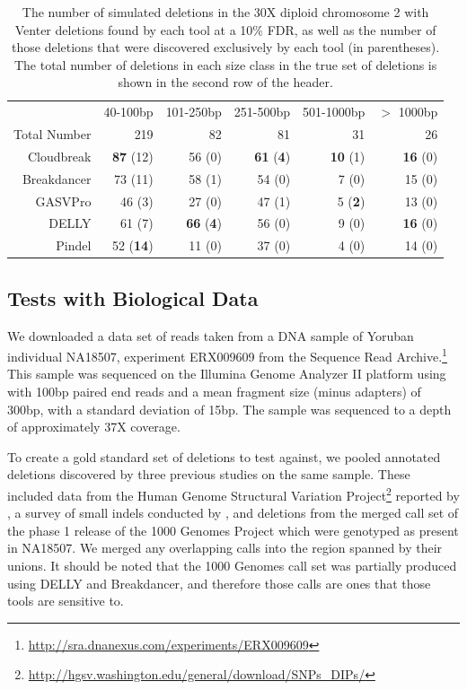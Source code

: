 \documentclass[11pt]{article}
\begin{document}
\begin{table}[b]
\begin{center}
\begin{tabular}{rrrrrr}
  \hline
 & 40-100bp  & 101-250bp  & 251-500bp & 501-1000bp & $>$ 1000bp \\ 
 Total Number & 219 & 82 & 81 & 31 & 26 \\ 
  \hline
Cloudbreak &  \textbf{87} (12) &  56 (0) &  \textbf{61} (\textbf{4}) &  \textbf{10} (1) &  \textbf{16} (0) \\ 
  Breakdancer &  73 (11) &  58 (1) &  54 (0) &  7 (0) &  15 (0) \\ 
  GASVPro &  46 (3) &  27 (0) &  47 (1) &  5 (\textbf{2}) &  13 (0) \\ 
  DELLY &  61 (7) &  \textbf{66} (\textbf{4}) &  56 (0) &  9 (0) &  \textbf{16} (0) \\ 
  Pindel &  52 (\textbf{14}) &  11 (0) &  37 (0) &   4 (0) &  14 (0) \\ 
   \hline
\end{tabular}
\end{center}
\caption{The number of simulated deletions in the 30X diploid chromosome 2 with Venter deletions found by each tool at a 10\% FDR, as well as the number of those deletions that were discovered exclusively by each tool (in parentheses). The total number of deletions in each size class in the true set of deletions is shown in the second row of the header.}
\label{chr2preds}
\end{table}

\subsection{Tests with Biological Data}

We downloaded a data set of reads taken from a DNA sample of Yoruban individual NA18507, experiment ERX009609 from the Sequence Read Archive.\footnote{\url{http://sra.dnanexus.com/experiments/ERX009609}} This sample was sequenced on the Illumina Genome Analyzer II platform using with 100bp paired end reads and a mean fragment size (minus adapters) of 300bp, with a standard deviation of 15bp. The sample was sequenced to a depth of approximately 37X coverage.

To create a gold standard set of deletions to test against, we pooled annotated deletions discovered by three previous studies on the same sample. These included data from the Human Genome Structural Variation Project\footnote{\url{http://hgsv.washington.edu/general/download/SNPs_DIPs/}} reported by \textcite{Kidd:2008p926}, a survey of small indels conducted by \textcite{Mills:2011fi}, and deletions from the merged call set of the phase 1 release of the 1000 Genomes Project \autocite{GenomesProjectConsortium:2012co} which were genotyped as present in NA18507. We merged any overlapping calls into the region spanned by their unions. It should be noted that the 1000 Genomes call set was partially produced using DELLY and Breakdancer, and therefore those calls are ones that those tools are sensitive to.
\end{document}
